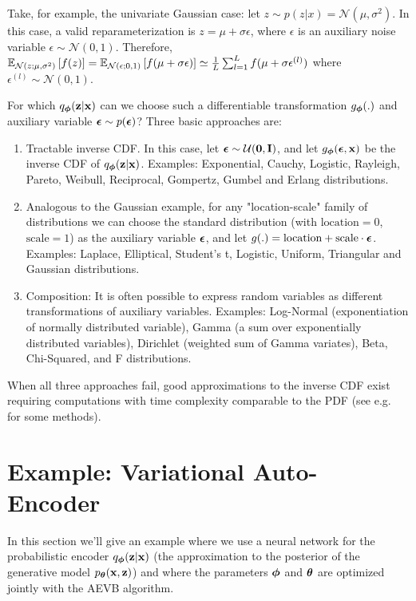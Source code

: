 \documentclass{article} %
\theoremstyle{definition}
\begin{document}
Take, for example, the univariate Gaussian case: let $z \sim p(z|x) = \mathcal{N}(\mu, \sigma^2)$. In this case, a valid reparameterization is $z = \mu + \sigma \epsilon$, where $\epsilon$ is an auxiliary noise variable $\epsilon \sim \mathcal{N}(0,1)$. Therefore, $\mathbb{E}_{\mathcal{N}(z; \mu, \sigma^2)}\left[f(z)\right] = \mathbb{E}_{\mathcal{N}(\epsilon; 0, 1)}\left[f(\mu + \sigma \epsilon)\right] \simeq \frac{1}{L} \sum_{l=1}^L f(\mu + \sigma \epsilon^{(l)})$ where $\epsilon^{(l)} \sim \mathcal{N}(0,1)$.

For which $q_{\boldsymbol{\phi}}(\mathbf{z}|\mathbf{x})$ can we choose such a differentiable transformation $g_{\boldsymbol{\phi}}(.)$ and auxiliary variable $\boldsymbol{\epsilon} \sim p(\boldsymbol{\epsilon})$? Three basic approaches are:
\begin{enumerate}
\item Tractable inverse CDF. In this case, let $\boldsymbol{\epsilon} \sim \mathcal{U}(\mathbf{0},\mathbf{I})$, and let $g_{\boldsymbol{\phi}}(\boldsymbol{\epsilon},\mathbf{x})$ be the inverse CDF of $q_{\boldsymbol{\phi}}(\mathbf{z}|\mathbf{x})$. Examples: Exponential, Cauchy, Logistic, Rayleigh, Pareto, Weibull, Reciprocal, Gompertz, Gumbel and Erlang distributions.

\item Analogous to the Gaussian example, for any "location-scale" family of distributions we can choose the standard distribution (with $\text{location} =0$, $\text{scale} =1$) as the auxiliary variable $\boldsymbol{\epsilon}$, and let $g(.)=\text{location}+\text{scale} \cdot \boldsymbol{\epsilon}$. Examples: Laplace, Elliptical, Student's t, Logistic, Uniform, Triangular and Gaussian distributions.

\item Composition: It is often possible to express random variables as different transformations of auxiliary variables. Examples: Log-Normal (exponentiation of normally distributed variable), Gamma (a sum over exponentially distributed variables), Dirichlet (weighted sum of Gamma variates), Beta, Chi-Squared, and F distributions.
\end{enumerate}

When all three approaches fail, good approximations to the inverse CDF exist requiring computations with time complexity comparable to the PDF (see e.g. ~\cite{devroye1986sample} for some methods).

\section{Example: Variational Auto-Encoder}
\label{sec:example}
In this section we'll give an example where we use a neural network for the probabilistic encoder $q_{\boldsymbol{\phi}}(\mathbf{z}|\mathbf{x})$ (the approximation to the posterior of the generative model $p_{\boldsymbol{\theta}}(\mathbf{x}, \mathbf{z})$) and where the parameters $\boldsymbol{\phi}$ and $\boldsymbol{\theta}$ are optimized jointly with the AEVB algorithm.
%
\end{document}
